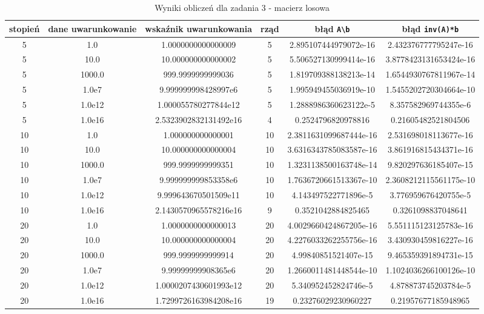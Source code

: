\documentclass{article}
\begin{document}
\begin{table}[!htpb]
  \begin{adjustbox}{center}
  \begin{tabular}{| c | c | c | c | c | c |}
    \hline
    stopień & dane uwarunkowanie & wskaźnik uwarunkowania & rząd & błąd \texttt{A\textbackslash b} & błąd \texttt{inv(A)*b} \\
    \hline
    5 & 1.0 & 1.0000000000000009 & 5 & 2.895107444979072e-16 & 2.432376777795247e-16\\
    5 & 10.0 & 10.000000000000002 & 5 & 5.506527130999414e-16 & 3.8778423131653424e-16\\
    5 & 1000.0 & 999.9999999999036 & 5 & 1.819709388138213e-14 & 1.6544930767811967e-14\\
    5 & 1.0e7 & 9.999999998428997e6 & 5 & 1.995949455036919e-10 & 1.5455202720304664e-10\\
    5 & 1.0e12 & 1.000055780277844e12 & 5 & 1.2888986360623122e-5 & 8.357582969744355e-6\\
    5 & 1.0e16 & 2.5323902832131492e16 & 4 & 0.2524796820978816 & 0.21605482521804506\\
    10 & 1.0 & 1.000000000000001 & 10 & 2.3811631099687444e-16 & 2.531698018113677e-16\\
    10 & 10.0 & 10.000000000000004 & 10 & 3.6316343785083587e-16 & 3.861916815434371e-16\\
    10 & 1000.0 & 999.9999999999351 & 10 & 1.3231138500163748e-14 & 9.820297636185407e-15\\
    10 & 1.0e7 & 9.999999999853358e6 & 10 & 1.7636720661513367e-10 & 2.3608212115561175e-10\\
    10 & 1.0e12 & 9.999643670501509e11 & 10 & 4.143497522771896e-5 & 3.776959676420755e-5\\
    10 & 1.0e16 & 2.1430570965578216e16 & 9 & 0.3521042884825465 & 0.3261098837048641\\
    20 & 1.0 & 1.0000000000000013 & 20 & 4.0029660424867205e-16 & 5.551115123125783e-16\\
    20 & 10.0 & 10.000000000000004 & 20 & 4.2276033262255756e-16 & 3.430930459816227e-16\\
    20 & 1000.0 & 999.9999999999914 & 20 & 4.99840851521407e-15 & 9.465359391894731e-15\\
    20 & 1.0e7 & 9.99999999908365e6 & 20 & 1.2660011481448544e-10 & 1.1024036266100126e-10\\
    20 & 1.0e12 & 1.0000207430601993e12 & 20 & 5.340952452824746e-5 & 4.878873745203784e-5\\
    20 & 1.0e16 & 1.7299726163984208e16 & 19 & 0.23276029230960227 & 0.21957677185948965\\
    \hline
  \end{tabular}
\end{adjustbox}

  \caption{Wyniki obliczeń dla zadania 3 - macierz losowa}
  \label{randommatrix}
\end{table}
\end{document}
